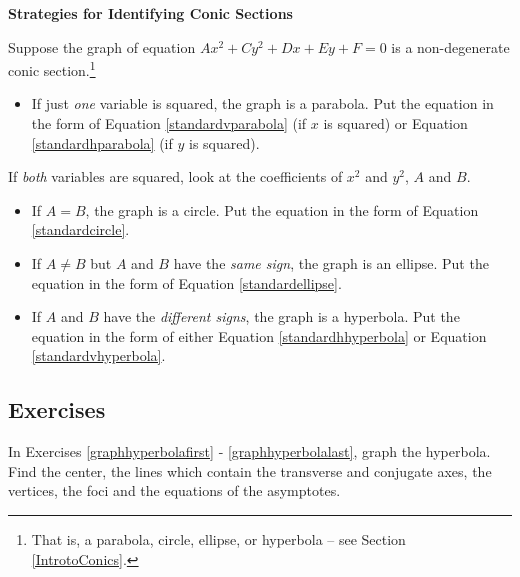 \smallskip

\label{idconocsrulesofthumb}
\colorbox{ResultColor}{\bbm

\centerline{\textbf{Strategies for Identifying Conic Sections}}

\smallskip

Suppose the graph of  equation $Ax^2 + Cy^2 + Dx + Ey + F = 0$ is a non-degenerate conic section.\footnote{That is, a parabola, circle, ellipse, or hyperbola -- see Section \ref{IntrotoConics}.}

\begin{itemize}

\item  If just \textit{one} variable is squared, the graph is a parabola.  Put the equation in the form of Equation \ref{standardvparabola} (if $x$ is squared)  or Equation \ref{standardhparabola} (if $y$ is squared).

\end{itemize}

If \textit{both} variables are squared, look at the coefficients of $x^2$ and $y^2$, $A$ and $B$.

\begin{itemize}

\item  If $A=B$, the graph is a circle.  Put the equation in the form of Equation \ref{standardcircle}.

\item If $A \neq B$ but $A$ and $B$ have the \textit{same sign}, the graph is an ellipse. Put the equation in the form of Equation \ref {standardellipse}.


\item   If  $A$ and $B$ have the \textit{different signs}, the graph is a hyperbola.  Put the equation in the form of either Equation \ref{standardhhyperbola} or Equation \ref{standardvhyperbola}.

\end{itemize}

\ebm}


    

\newpage

\subsection{Exercises}


In Exercises \ref{graphhyperbolafirst} - \ref{graphhyperbolalast}, graph the hyperbola.  Find the center, the lines which contain the transverse and conjugate axes, the vertices, the foci and the equations of the asymptotes.

